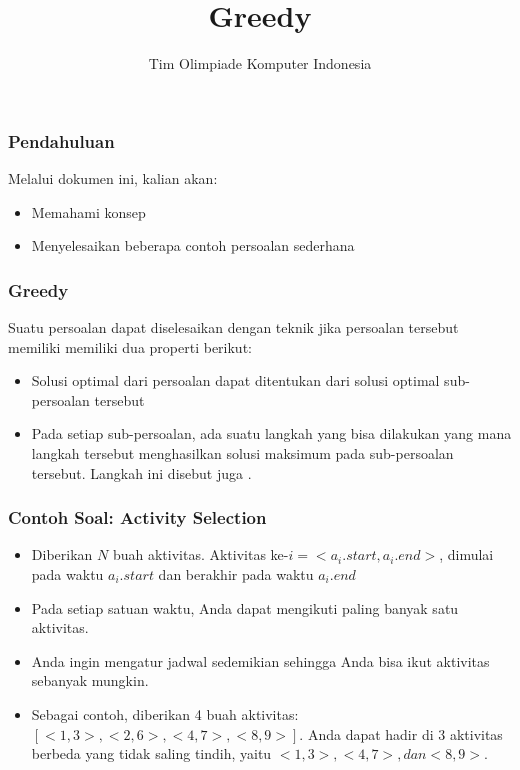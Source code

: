  

\title{Greedy}
\author{Tim Olimpiade Komputer Indonesia}
\date{}



\begin{frame}
	\titlepage
\end{frame}

\begin{frame}
	\frametitle{Pendahuluan}
	Melalui dokumen ini, kalian akan:
	\begin{itemize}
		\item Memahami konsep 
		\item Menyelesaikan beberapa contoh persoalan  sederhana
	\end{itemize}
\end{frame}
	
\begin{frame}
	\frametitle{Greedy}
	Suatu persoalan dapat diselesaikan dengan teknik  jika persoalan tersebut memiliki memiliki dua properti berikut:
	\begin{itemize}

		\item Solusi optimal dari persoalan dapat ditentukan dari solusi optimal sub-persoalan tersebut
		\item Pada setiap sub-persoalan, ada suatu langkah yang bisa dilakukan yang mana langkah tersebut menghasilkan solusi maksimum pada sub-persoalan tersebut. Langkah ini disebut juga . 
	\end{itemize}
\end{frame}

\begin{frame}
	\frametitle{Contoh Soal: Activity Selection}
	\begin{itemize}
		\item Diberikan $N$ buah aktivitas. Aktivitas ke-$i = <a_i.start, a_i.end>$,  dimulai pada waktu $a_i.start$ dan berakhir pada waktu $a_i.end$
		\item Pada setiap satuan waktu, Anda dapat mengikuti paling banyak satu aktivitas.
		\item Anda ingin mengatur jadwal sedemikian sehingga Anda bisa ikut aktivitas sebanyak mungkin.
		\item Sebagai contoh, diberikan 4 buah aktivitas: $[ <1, 3> , <2, 6>, <4, 7>,  <8, 9> ]$. Anda dapat hadir di 3 aktivitas berbeda yang tidak saling tindih, yaitu $<1, 3>, <4, 7>, dan <8, 9>$. 
	\end{itemize}
\end{frame}



